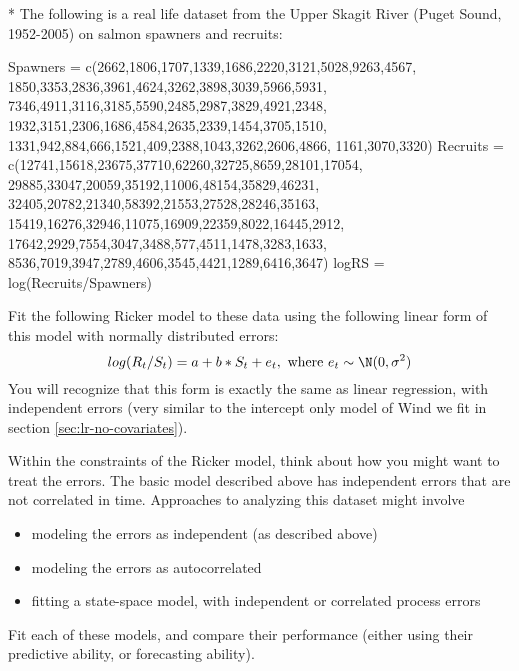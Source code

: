 \begin{hwenumerate}
\item[\theenumi\**] The following is a real life dataset from the Upper Skagit River (Puget Sound, 1952-2005) on salmon spawners and recruits:

\begin{Schunk}
\begin{Sinput}
 Spawners = c(2662,1806,1707,1339,1686,2220,3121,5028,9263,4567,
              1850,3353,2836,3961,4624,3262,3898,3039,5966,5931,
              7346,4911,3116,3185,5590,2485,2987,3829,4921,2348,
              1932,3151,2306,1686,4584,2635,2339,1454,3705,1510,
              1331,942,884,666,1521,409,2388,1043,3262,2606,4866,
              1161,3070,3320)
 Recruits = c(12741,15618,23675,37710,62260,32725,8659,28101,17054,
              29885,33047,20059,35192,11006,48154,35829,46231,
              32405,20782,21340,58392,21553,27528,28246,35163,
              15419,16276,32946,11075,16909,22359,8022,16445,2912,
              17642,2929,7554,3047,3488,577,4511,1478,3283,1633,
              8536,7019,3947,2789,4606,3545,4421,1289,6416,3647)
 logRS = log(Recruits/Spawners)
\end{Sinput}
\end{Schunk}

Fit the following Ricker model to these data using the following linear form of this model with normally distributed errors:   
\begin{equation}
log(R_{t}/S_{t}) = a + b * S_{t} + e_{t},\text{ where } e_{t} \sim \N(0,\sigma^2)
\end{equation}
You will recognize that this form is exactly the same as linear regression, with independent errors (very similar to the intercept only model of Wind we fit in section \ref{sec:lr-no-covariates}).

Within the constraints of the Ricker model, think about how you might want to treat the errors. The basic model described above has independent errors that are not correlated in time. Approaches to analyzing this dataset might involve

\begin{itemize}
\item modeling the errors as independent (as described above)
\item modeling the errors as autocorrelated
\item fitting a state-space model, with independent or correlated process errors
\end{itemize}

Fit each of these models, and compare their performance (either using their predictive ability, or forecasting ability).

\end{hwenumerate}

